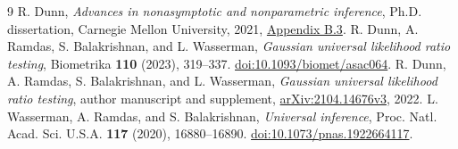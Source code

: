 \documentclass[11pt,a4paper]{amsart}
\begin{document}
\begin{thebibliography}{9}
R. Dunn, \emph{Advances in nonasymptotic and nonparametric inference}, Ph.D. dissertation, Carnegie Mellon University, 2021, \href{https://robinmdunn.github.io/files/RobinDunn-dissertation.pdf\#page=145}{Appendix B.3}.
R. Dunn, A. Ramdas, S. Balakrishnan, and L. Wasserman, \emph{Gaussian universal likelihood ratio testing}, Biometrika \textbf{110} (2023), 319--337. \href{https://doi.org/10.1093/biomet/asac064}{doi:10.1093/biomet/asac064}.
R. Dunn, A. Ramdas, S. Balakrishnan, and L. Wasserman, \emph{Gaussian universal likelihood ratio testing}, author manuscript and supplement, \href{https://arxiv.org/html/2104.14676v3}{arXiv:2104.14676v3}, 2022.
L. Wasserman, A. Ramdas, and S. Balakrishnan, \emph{Universal inference}, Proc. Natl. Acad. Sci. U.S.A. \textbf{117} (2020), 16880--16890. \href{https://doi.org/10.1073/pnas.1922664117}{doi:10.1073/pnas.1922664117}.
\end{thebibliography}
\end{document}
